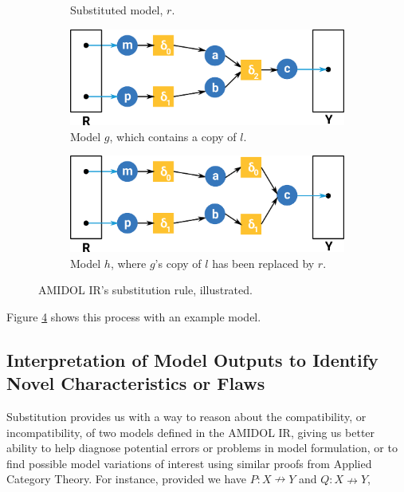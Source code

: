\documentclass[12pt]{galois-whitepaper}
\begin{document}
\begin{figure}
\begin{subfigure}[b]{0.3\textwidth}
      \caption{Substituted model, $r$.}
      \label{Fig:Sub-R}
    \end{subfigure}
    \begin{subfigure}[b]{0.45\textwidth}
      \includegraphics[width=\textwidth]{series-2.png}
      \caption{Model $g$, which contains a copy of $l$.}
      \label{Fig:Sub-G}
    \end{subfigure}
    \begin{subfigure}[b]{0.45\textwidth}
      \includegraphics[width=\textwidth]{substitution-1.png}
      \caption{Model $h$, where $g$'s copy of $l$ has been replaced by
        $r$.}
      \label{Fig:Sub-H}
    \end{subfigure}
    \caption{AMIDOL IR's substitution rule, illustrated.}
    \label{Fig:Substitution}
  \end{figure}

Figure \ref{Fig:Substitution} shows this process with an example
model.

\subsection{Interpretation of Model Outputs to Identify Novel
    Characteristics or Flaws}

Substitution provides us with a way to reason about the compatibility,
or incompatibility, of two models defined in the AMIDOL IR, giving us
better ability to help diagnose potential errors or problems in model
formulation, or to find possible model variations of interest using
similar proofs from Applied Category Theory.  For instance, provided
we have $P: X \nrightarrow Y$ and $Q: X \nrightarrow Y$,
\end{document}
